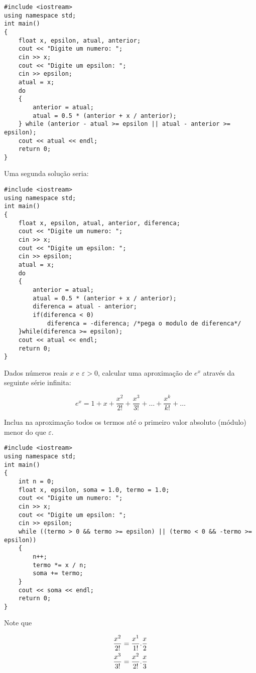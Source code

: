 \documentclass[a4paper]{memoir}
\begin{document}
\begin{sol}
\begin{lstlisting}
#include <iostream>
using namespace std;
int main()
{
    float x, epsilon, atual, anterior;
    cout << "Digite um numero: ";
    cin >> x;
    cout << "Digite um epsilon: ";
    cin >> epsilon;
    atual = x;
    do
    {
        anterior = atual;
        atual = 0.5 * (anterior + x / anterior);
    } while (anterior - atual >= epsilon || atual - anterior >= epsilon);
    cout << atual << endl;
    return 0;
}
\end{lstlisting}

Uma segunda solução seria:

\begin{lstlisting}
#include <iostream>
using namespace std;
int main()
{
    float x, epsilon, atual, anterior, diferenca;
    cout << "Digite um numero: ";
    cin >> x;
    cout << "Digite um epsilon: ";
    cin >> epsilon;
    atual = x;
    do
    {
        anterior = atual;
        atual = 0.5 * (anterior + x / anterior);
        diferenca = atual - anterior;
        if(diferenca < 0)
            diferenca = -diferenca; /*pega o modulo de diferenca*/
    }while(diferenca >= epsilon);
    cout << atual << endl;
    return 0;
}
\end{lstlisting}

\end{sol}

\begin{prob}\label{prob205.cpp}
Dados números reais $x$ e $\varepsilon > 0$, calcular uma aproximação de $e^x$ através da seguinte série infinita:

\[
e^x = 1 + x + \frac{x^2}{2!} + \frac{x^3}{3!} + \ldots + \frac{x^k}{k!} + \ldots
\]

Inclua na aproximação todos os termos até o primeiro valor absoluto (módulo) menor do que $\varepsilon$.
\end{prob}

\begin{sol}
\begin{lstlisting}
#include <iostream>
using namespace std;
int main()
{
    int n = 0;
    float x, epsilon, soma = 1.0, termo = 1.0;
    cout << "Digite um numero: ";
    cin >> x;
    cout << "Digite um epsilon: ";
    cin >> epsilon;
    while ((termo > 0 && termo >= epsilon) || (termo < 0 && -termo >= epsilon))
    {
        n++;
        termo *= x / n;
        soma += termo;
    }
    cout << soma << endl;
    return 0;
}
\end{lstlisting}

Note que

\[
\begin{gathered}
  \frac{x^2}{2!} = \frac{x^1}{1!}.\frac{x}{2} \hfill \\
  \frac{x^3}{3!} = \frac{x^2}{2!}.\frac{x}{3} \hfill \\
\end{gathered}
\]

\end{sol}
\end{document}
